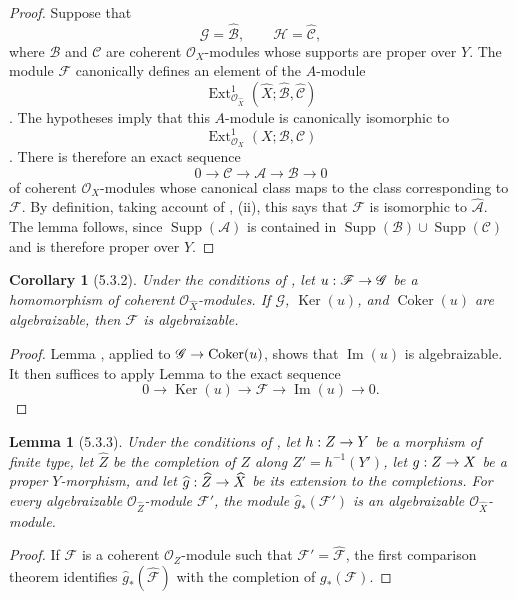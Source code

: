 \documentclass[oneside]{amsart}
\theoremstyle{ega-env-style}
\theoremstyle{ega-thm-env-style}
\newtheorem*{lemma}{Lemma}
\newtheorem*{corollary}{Corollary}
\theoremstyle{ega-defn-env-style}
\def\mathcal{\mathscr}
\def\sh{\mathcal}                   %
\def\Ext{\operatorname{Ext}}
\def\Supp{\operatorname{Supp}}
\def\Ker{\operatorname{Ker}}
\def\Im{\operatorname{Im}}
\def\Coker{\operatorname{Coker}}
\renewcommand{\to}{\mathchoice{\longrightarrow}{\rightarrow}{\rightarrow}{\rightarrow}}
\let\EGAOriginalLabel\label
\renewcommand{\label}[1]{\phantomsection\EGAOriginalLabel{#1}}
\begin{document}
\begin{proof}
Suppose that
\[
  \sh{G}=\widehat{\sh{B}},
  \qquad
  \sh{H}=\widehat{\sh{C}},
\]
where $\sh{B}$ and $\sh{C}$ are coherent $\sh{O}_X$-modules whose
supports are proper over $Y$.  The module $\sh{F}$ canonically
defines an element of the $A$-module
\[
  \Ext^1_{\sh{O}_{\widehat{X}}}
  (\widehat{X};\widehat{\sh{B}},\widehat{\sh{C}})
\]
.  The hypotheses imply that this $A$-module is
canonically isomorphic to
\[
  \Ext^1_{\sh{O}_X}(X;\sh{B},\sh{C})
\]
.  There is therefore an exact sequence
\[
  0\longrightarrow\sh{C}\longrightarrow\sh{A}
  \longrightarrow\sh{B}\longrightarrow0
\]
of coherent $\sh{O}_X$-modules whose canonical class maps to the
class corresponding to $\sh{F}$.  By definition, taking account of
, (ii), this says that $\sh{F}$ is isomorphic to
$\widehat{\sh{A}}$.  The lemma follows, since
$\Supp(\sh{A})$ is contained in
$\Supp(\sh{B})\cup\Supp(\sh{C})$ and is therefore proper over $Y$.
\end{proof}

\begin{corollary}[5.3.2]
\label{III.5.3.2}
Under the conditions of , let
$u:\sh{F}\to\sh{G}$ be a homomorphism of coherent
$\sh{O}_{\widehat{X}}$-modules.  If $\sh{G}$, $\Ker(u)$, and
$\Coker(u)$ are algebraizable, then $\sh{F}$ is algebraizable.
\end{corollary}

\begin{proof}
Lemma , applied to
$\sh{G}\to\Coker(u)$, shows that $\Im(u)$ is algebraizable.  It then
suffices to apply Lemma  to the exact sequence
\[
  0\longrightarrow\Ker(u)\longrightarrow\sh{F}
  \longrightarrow\Im(u)\longrightarrow0.
\]
\end{proof}

\begin{lemma}[5.3.3]
\label{III.5.3.3}
Under the conditions of , let $h:Z\to Y$ be a
morphism of finite type, let $\widehat{Z}$ be the completion of $Z$
along $Z'=h^{-1}(Y')$, let $g:Z\to X$ be a proper $Y$-morphism,
and let $\widehat{g}:\widehat{Z}\to\widehat{X}$ be its extension to
the completions.  For every algebraizable
$\sh{O}_{\widehat{Z}}$-module $\sh{F}'$, the module
$\widehat{g}_*(\sh{F}')$ is an algebraizable
$\sh{O}_{\widehat{X}}$-module.
\end{lemma}

\begin{proof}
If $\sh{F}$ is a coherent $\sh{O}_Z$-module such that
$\sh{F}'=\widehat{\sh{F}}$, the first comparison theorem
 identifies
$\widehat{g}_*(\widehat{\sh{F}})$ with the completion of
$g_*(\sh{F})$.
\end{proof}
\end{document}
